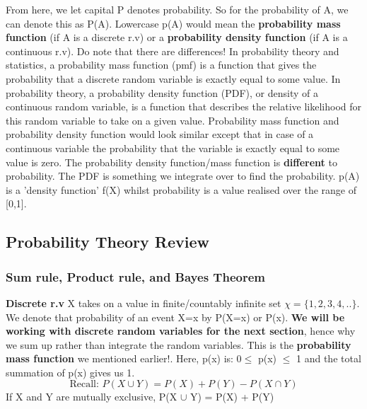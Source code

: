 \documentclass[11pt, oneside]{article}
\theoremstyle{definition}
\begin{document}
From here, we let capital P denotes probability. So for the probability of A, we can denote this as P(A). Lowercase p(A) would mean the \textbf{probability mass function} (if A is a discrete r.v) or a \textbf{probability density function} (if A is a continuous r.v). Do note that there are differences! In probability theory and statistics, a probability mass function (pmf) is a function that gives the probability that a discrete random variable is exactly equal to some value. In probability theory, a probability density function (PDF), or density of a continuous random variable, is a function that describes the relative likelihood for this random variable to take on a given value. Probability mass function and probability density function would look similar except that in case of a continuous variable the probability that the variable is exactly equal to some value is zero. The probability density function/mass function is \textbf{different} to probability. The PDF is something we integrate over to find the probability. p(A) is a 'density function' f(X) whilst probability is a value realised over the range of [0,1].

\subsection{Probability Theory Review}
\subsubsection{Sum rule, Product rule, and Bayes Theorem}
\textbf{Discrete r.v} X takes on a value in finite/countably infinite set $\chi = \{1,2,3,4,..\}$. We denote that probability of an event X=x by P(X=x) or P(x). \textbf{We will be working with discrete random variables for the next section}, hence why we sum up rather than integrate the random variables. This is the \textbf{probability mass function} we mentioned earlier!. Here, p(x) is: 0$\leq$ p(x) $\leq$ 1 and the total summation of p(x) gives us 1.
$$
\text{Recall: } P(X \cup Y) = P(X) + P(Y) - P(X \cap Y)
$$
If X and Y are mutually exclusive, P(X $\cup$ Y) = P(X) + P(Y)
\end{document}
